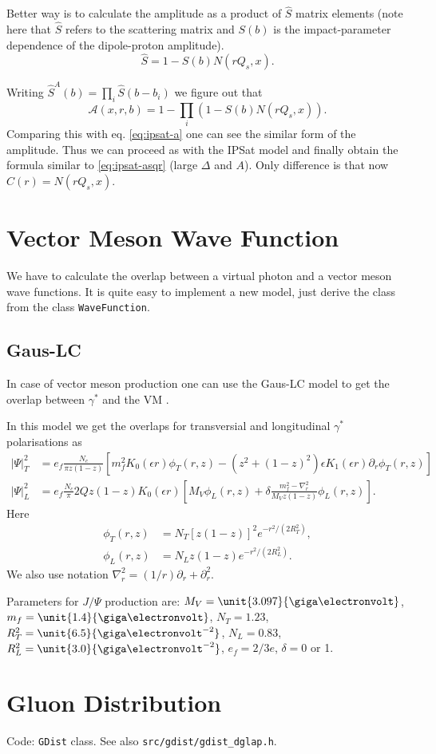 \documentclass[a4paper,12pt]{article}
\newcommand{\code}[1]{\texttt{#1}}
\newcommand{\A}{\mathcal{A}}
\begin{document}
Better way is to calculate the amplitude as a product of $\hat S$ matrix elements (note here that $\hat S$ refers to the scattering matrix and $S(b)$ is the impact-parameter dependence of the dipole-proton amplitude). 
\begin{equation}
	\hat S = 1-S(b)N(rQ_s,x).
\end{equation}

Writing $\hat S^A(b) = \prod_i \hat S(b-b_i)$ we figure out that
\begin{equation}
	\A(x,r,b) = 1 - \prod_i \left( 1-S(b)N(rQ_s,x) \right).
\end{equation}
Comparing this with eq. \eqref{eq:ipsat-a} one can see the similar form of the amplitude. Thus we can proceed as with the IPSat model and finally obtain the formula similar to \eqref{eq:ipsat-asqr} (large $\Delta$ and $A$). Only difference is that now $C(r)=N(rQ_s,x)$.

\section{Vector Meson Wave Function}
We have to calculate the overlap between a virtual photon and a vector meson wave functions. It is quite easy to implement a new model, just derive the class from the class \code{WaveFunction}.

\subsection{Gaus-LC}
In case of vector meson production one can use the Gaus-LC model to get the overlap between $\gamma^*$ and the VM \cite{Kowalski:2006hc}.

In this model we get the overlaps for transversial and longitudinal $\gamma^*$ polarisations as
\begin{align}
	|\Psi |^2_T &= e_f \frac{N_c}{\pi z(1-z)} \left[ m_f^2 K_0(\epsilon r)\phi_T(r,z) - (z^2 + (1-z)^2) \epsilon K_1(\epsilon r) \partial_r \phi_T(r,z) \right] \\
	|\Psi |^2_L &= e_f \frac{N_c}{\pi} 2Q z (1-z)K_0(\epsilon r) \left[ M_V \phi_L(r,z) + \delta \frac{m_f^2 - \nabla_r^2}{M_V z(1-z)}\phi_L(r,z) \right].
\end{align}
Here
\begin{align}
	\phi_T(r,z) &= N_T \left[ z(1-z)\right]^2 e^{-r^2/(2R_T^2)}, \\
	\phi_L(r,z) &= N_L z(1-z) e^{-r^2/(2R_L^2)}.
\end{align}
We also use notation $\nabla_r^2 = (1/r)\partial_r + \partial_r^2$.

Parameters for $J/\Psi$ production are: $M_V = \unit{3.097}{\giga\electronvolt}$, $m_f = \unit{1.4}{\giga\electronvolt}$, $N_T = 1.23$, $R_T^2 = \unit{6.5}{\giga\electronvolt^{-2}}$, $N_L=0.83$, $R_L^2 = \unit{3.0}{\giga\electronvolt^{-2}}$, $e_f = 2/3 e$, $\delta = 0$ or 1.


\section{Gluon Distribution}
\label{gdist}
Code: \code{GDist} class. See also \code{src/gdist/gdist\_dglap.h}.


\end{document}

